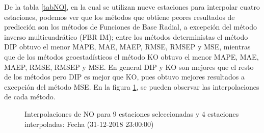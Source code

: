 De la tabla \ref{tabNO}, en la cual se utilizan nueve estaciones para interpolar cuatro estaciones, podemos ver que los métodos que obtiene peores resultados de predicción son los métodos de Funciones de Base Radial, a excepción del método inverso multicuadrático (FBR IM); entre los métodos deterministas el método DIP obtuvo el menor MAPE, MAE, MAEP, RMSE, RMSEP y MSE, mientras que de los métodos geoestadísticos el método KO obtuvo el menor MAPE, MAE, MAEP, RMSE, RMSEP y MSE. En general DIP y KO son mejores que el resto de los métodos pero DIP es mejor que KO, pues obtuvo mejores resultados a excepción del método MSE. En la figura \ref{NOfigure1}, se pueden observar las interpolaciones de cada método.


\begin{figure}[H]
\centering
{}
\subfigure[KO] {\texttt{[image: ./ok\_9\_1\_26302]}}
\subfigure[KU] {\texttt{[image: ./uk\_9\_1\_26302]}}
\caption{Interpolaciones de  NO para 9 estaciones seleccionadas y 4 estaciones interpoladas: Fecha (31-12-2018 23:00:00)}
\label{NOfigure1}
\end{figure}


